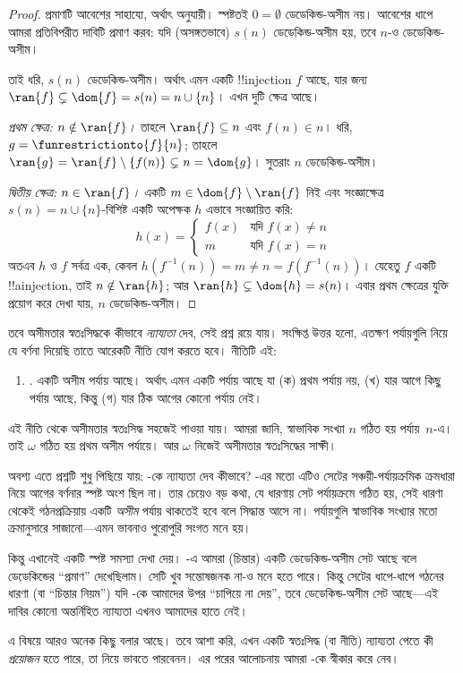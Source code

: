 \documentclass[../../../include/open-logic-section]{subfiles}
\begin{document}
\begin{proof}
প্রমাণটি আবেশের সাহায্যে, অর্থাৎ
 অনুযায়ী।
স্পষ্টতই $0 = \emptyset$ ডেডেকিন্ড-অসীম নয়। আবেশের ধাপে
আমরা প্রতিবিপরীত দাবিটি প্রমাণ করব: যদি (অসঙ্গতভাবে)
$s(n)$ ডেডেকিন্ড-অসীম হয়, তবে $n$-ও ডেডেকিন্ড-অসীম।

তাই ধরি, $s(n)$ ডেডেকিন্ড-অসীম। অর্থাৎ এমন একটি
!!{injection} $f$ আছে, যার জন্য
$\ran{f}\subsetneq \dom{f} = s(n) = n \cup \{n\}$।
এখন দুটি ক্ষেত্র আছে।

\emph{প্রথম ক্ষেত্র: $n \notin \ran{f}$।} তাহলে
$\ran{f} \subseteq n$ এবং $f(n) \in n$। ধরি,
$g = \funrestrictionto{f}{n}$; তাহলে
$\ran{g} = \ran{f} \setminus \{f(n)\} \subsetneq n = \dom{g}$।
সুতরাং $n$ ডেডেকিন্ড-অসীম।

\emph{দ্বিতীয় ক্ষেত্র: $n \in \ran{f}$।} একটি
$m \in \dom{f} \setminus \ran{f}$ নিই এবং সংজ্ঞাক্ষেত্র
$s(n) = n \cup \{n\}$-বিশিষ্ট একটি অপেক্ষক $h$ এভাবে
সংজ্ঞায়িত করি:
\[
h(x) =
	\begin{cases}
		f(x) & \text{যদি }f(x) \neq n\\
		m & \text{যদি }f(x)=n
	\end{cases}
\]
অতএব $h$ ও $f$ সর্বত্র এক, কেবল
$h(f^{-1}(n)) = m \neq n = f(f^{-1}(n))$। যেহেতু
$f$ একটি !!a{injection}, তাই $n \notin \ran{h}$;
আর $\ran{h} \subsetneq \dom{h} = s(n)$। এবার প্রথম
ক্ষেত্রের যুক্তি প্রয়োগ করে দেখা যায়, $n$ ডেডেকিন্ড-অসীম।
\end{proof}

তবে অসীমতার স্বতঃসিদ্ধকে কীভাবে
\emph{ন্যায্যতা} দেব, সেই প্রশ্ন রয়ে যায়। সংক্ষিপ্ত উত্তর
হলো, এতক্ষণ পর্যায়গুলি নিয়ে যে বর্ণনা দিয়েছি তাতে আরেকটি
নীতি যোগ করতে হবে। নীতিটি এই:
\begin{enumerate}
	\item[] \stagesinf. একটি অসীম পর্যায় আছে। অর্থাৎ এমন একটি পর্যায় আছে যা (ক) প্রথম পর্যায় নয়, (খ) যার আগে কিছু পর্যায় আছে, কিন্তু (গ) যার ঠিক আগের কোনো পর্যায় নেই।
\end{enumerate}
এই নীতি থেকে অসীমতার স্বতঃসিদ্ধ সহজেই পাওয়া যায়। আমরা
জানি, স্বাভাবিক সংখ্যা $n$ গঠিত হয় পর্যায়~$n$-এ। তাই
$\omega$ গঠিত হয় প্রথম অসীম পর্যায়ে। আর $\omega$ নিজেই
অসীমতার স্বতঃসিদ্ধের সাক্ষী।

অবশ্য এতে প্রশ্নটি শুধু পিছিয়ে যায়: \stagesinf{}-কে
ন্যায্যতা দেব কীভাবে? \stagessucc-এর মতো এটিও সেটের
সঞ্চয়ী-পর্যায়ক্রমিক ক্রমধারা নিয়ে আগের বর্ণনার স্পষ্ট অংশ ছিল
না। তার চেয়েও বড় কথা, যে ধারণায় সেট পর্যায়ক্রমে গঠিত
হয়, সেই ধারণা থেকেই গঠনপ্রক্রিয়ায় একটি
\emph{অসীম} পর্যায় থাকতেই হবে বলে সিদ্ধান্ত আসে না।
পর্যায়গুলি স্বাভাবিক সংখ্যার মতো ক্রমানুসারে সাজানো—এমন
ভাবনাও পুরোপুরি সংগত মনে হয়।

কিন্তু এখানেই একটি স্পষ্ট সমস্যা দেখা দেয়।
-এ আমরা
(চিন্তার) একটি ডেডেকিন্ড-অসীম সেট আছে বলে ডেডেকিন্ডের
``প্রমাণ'' দেখেছিলাম। সেটি খুব সন্তোষজনক না-ও মনে হতে
পারে। কিন্তু সেটের ধাপে-ধাপে গঠনের ধারণা (বা ``চিন্তার
নিয়ম'') যদি \stagesinf{}-কে আমাদের উপর ``চাপিয়ে না দেয়'',
তবে ডেডেকিন্ড-অসীম সেট আছে—এই দাবির কোনো অন্তর্নিহিত
ন্যায্যতা এখনও আমাদের হাতে নেই।

এ বিষয়ে আরও অনেক কিছু বলার আছে। তবে আশা করি, এখন
একটি স্বতঃসিদ্ধ (বা নীতি) ন্যায্যতা পেতে কী
\emph{প্রয়োজন} হতে পারে, তা নিয়ে ভাবতে পারবেনন। এর পরের
আলোচনায় আমরা \stagesinf{}-কে স্বীকার করে নেব।
\end{document}
